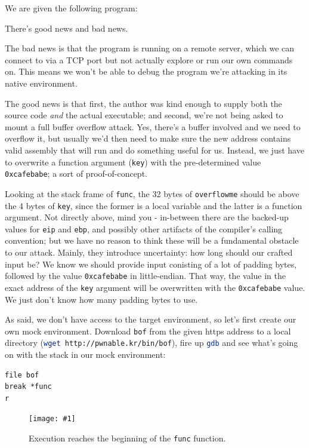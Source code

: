 \documentclass{article}
\newcommand{\displayimagecap}[2] {
\begin{figure}
    \centering
    \texttt{[image: \#1]} 
    \caption{#2}
\end{figure}
}
\newcommand{\xcode}[2]{\colorbox{ubuntuback}{\lstinline[language=#1]|#2|}}
\newcommand{\asm}[1]{\xcode{{[x86masm]assembler}}{#1}}
\newcommand{\code}[1]{\colorbox{ubuntuback}{\texttt{#1}}}
\begin{document}
We are given the following program:



There's good news and bad news.

The bad news is that the program is running on a remote server, which we can connect to via a TCP port but not actually explore or run our own commands on. This means we won't be able to debug the program we're attacking in its native environment.

The good news is that first, the author was kind enough to supply both the source code \textit{and} the actual executable; and second, we're not being asked to mount a full buffer overflow attack. Yes, there's a buffer involved and we need to overflow it, but usually we'd then need to make sure the new address contains valid assembly that will run and do something useful for us. Instead, we just have to overwrite a function argument (\xcode{C}{key}) with the pre-determined value \code{0xcafebabe}; a sort of proof-of-concept.

Looking at the stack frame of \xcode{C}{func}, the 32 bytes of \xcode{C}{overflowme} should be above the 4 bytes of \xcode{C}{key}, since the former is a local variable and the latter is a function argument. Not directly above, mind you - in-between there are the backed-up values for \asm{eip} and \asm{ebp}, and possibly other artifacts of the compiler's calling convention; but we have no reason to think these will be a fundamental obstacle to our attack. Mainly, they introduce uncertainty: how long should our crafted input be? We know we should provide input conisting of a lot of padding bytes, followed by the value \code{0xcafebabe} in little-endian. That way, the value in the exact address of the \xcode{C}{key} argument will be overwritten with the \code{0xcafebabe} value. We just don't know how many padding bytes to use.

As said, we don't have access to the target environment, so let's first create our own mock environment. Download \code{bof} from the given https address to a local directory (\xcode{bash}{wget http://pwnable.kr/bin/bof}), fire up \xcode{bash}{gdb} and see what's going on with the stack in our mock environment:
\begin{lstlisting}
file bof
break *func
r
\end{lstlisting}

\displayimagecap{../02_bof/func_breakpoint.png}{Execution reaches the beginning of the \code{func} function.}
\end{document}

